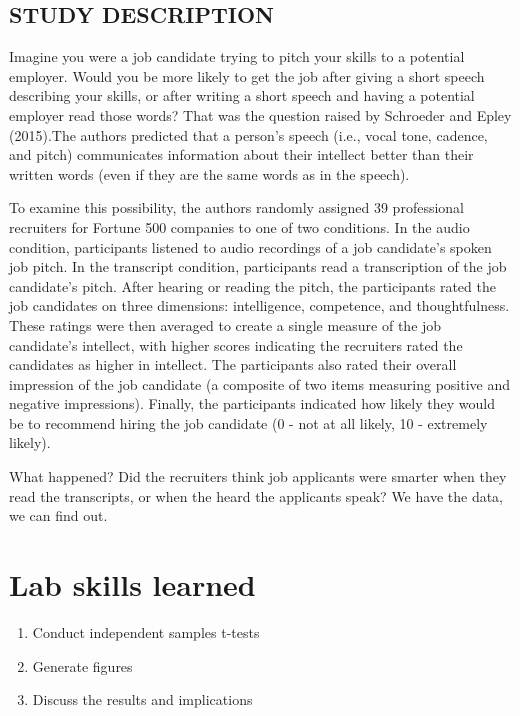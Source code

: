 \documentclass[
]{book}
\providecommand{\tightlist}{%
  \setlength{\itemsep}{0pt}\setlength{\parskip}{0pt}}
\begin{document}
\hypertarget{study-description-2}{%
\subsection{STUDY DESCRIPTION}\label{study-description-2}}

Imagine you were a job candidate trying to pitch your skills to a potential employer. Would you be more likely to get the job after giving a short speech describing your skills, or after writing a short speech and having a potential employer read those words? That was the question raised by Schroeder and Epley (2015).The authors predicted that a person's speech (i.e., vocal tone, cadence, and pitch) communicates information about their intellect better than their written words (even if they are the same words as in the speech).

To examine this possibility, the authors randomly assigned 39 professional recruiters for Fortune 500 companies to one of two conditions. In the audio condition, participants listened to audio recordings of a job candidate's spoken job pitch. In the transcript condition, participants read a transcription of the job candidate's pitch. After hearing or reading the pitch, the participants rated the job candidates on three dimensions: intelligence, competence, and thoughtfulness. These ratings were then averaged to create a single measure of the job candidate's intellect, with higher scores indicating the recruiters rated the candidates as higher in intellect. The participants also rated their overall impression of the job candidate (a composite of two items measuring positive and negative impressions). Finally, the participants indicated how likely they would be to recommend hiring the job candidate (0 - not at all likely, 10 - extremely likely).

What happened? Did the recruiters think job applicants were smarter when they read the transcripts, or when the heard the applicants speak? We have the data, we can find out.

\hypertarget{lab-skills-learned-1}{%
\section{Lab skills learned}\label{lab-skills-learned-1}}

\begin{enumerate}
\def\labelenumi{\arabic{enumi}.}
\tightlist
\item
  Conduct independent samples t-tests
\item
  Generate figures
\item
  Discuss the results and implications
\end{enumerate}
\end{document}
